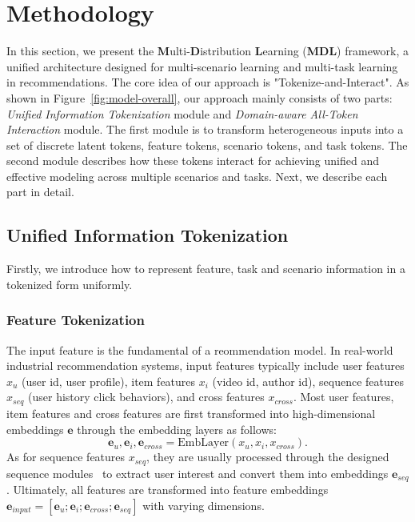 \section{Methodology}
\label{sec-model}
In this section, we present the \textbf{M}ulti-\textbf{D}istribution \textbf{L}earning (\textbf{MDL}) framework, a unified architecture designed for multi-scenario learning and multi-task learning in recommendations.
The core idea of our approach is "Tokenize-and-Interact".
As shown in Figure~\ref{fig:model-overall}, our approach mainly consists of two parts: \emph{Unified Information Tokenization} module and \emph{Domain-aware All-Token Interaction} module.
The first module is to transform heterogeneous inputs into a set of discrete latent tokens, \ie feature tokens, scenario tokens, and task tokens.
The second module describes how these tokens interact for achieving unified and effective modeling across multiple scenarios and tasks.
Next, we describe each part in detail.

\subsection{Unified Information Tokenization}
Firstly, we introduce how to represent feature, task and scenario information in a tokenized form uniformly.

\subsubsection{Feature Tokenization}
The input feature is the fundamental of a reommendation model.
In real-world industrial recommendation systems, input features typically include user features $x_u$ (\eg user id, user profile), item features $x_i$ (\eg video id, author id), sequence features $x_{seq}$ (\eg user history click behaviors), and cross features $x_{cross}$. 
Most user features, item features and cross features are first transformed into high-dimensional embeddings $\bm{e}$ through the embedding layers as follows:
\begin{equation}
\bm{e}_{u}, \bm{e}_{i}, \bm{e}_{cross} = \text{EmbLayer}(x_u,x_i,x_{cross}).
\end{equation}
As for sequence features $x_{seq}$, they are usually processed through the designed sequence modules~\cite{DIN,Longer,SIM} to extract user interest and convert them into embeddings $\bm{e}_{seq}$. 
Ultimately, all features are transformed into feature embeddings $\bm{e}_{input} = [\bm{e}_u; \bm{e}_i; \bm{e}_{cross}; \bm{e}_{seq}]$ with varying dimensions.

